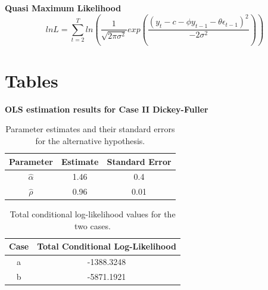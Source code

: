\documentclass[12pt]{article}
\begin{document}
\textbf{Quasi Maximum Likelihood}
 \begin{equation}
     ln L = \sum_{t=2}^{T} ln (\frac{1}{\sqrt{2\pi \sigma^2}} exp(\frac{(y_t -c -\phi y_{t-1} - \theta \epsilon_{t-1})^2}{-2 \sigma^2} ))
     \label{eq:QML}
 \end{equation}

\newpage
\section{Tables}
\textbf{OLS estimation results for Case II Dickey-Fuller}
\begin{table}[h!]
\centering
\begin{tabular}{|c|c|c|}
\hline
\textbf{Parameter} & \textbf{Estimate} & \textbf{Standard Error} \\ \hline
$\hat{\alpha}$     & 1.46              & 0.4                     \\ \hline
$\hat{\rho}$       & 0.96              & 0.01                    \\ \hline
\end{tabular}
\caption{Parameter estimates and their standard errors for the alternative hypothesis.}
\label{tab:parameter_estimates}
\end{table}

\begin{table}[h!]
\centering
\begin{tabular}{|c|c|}
\hline
\textbf{Case} & \textbf{Total Conditional Log-Likelihood} \\ \hline
a             & -1388.3248                                \\ \hline
b             & -5871.1921                                \\ \hline
\end{tabular}
\caption{Total conditional log-likelihood values for the two cases.}
\label{tab:log_likelihood_results}
\end{table}
\end{document}
